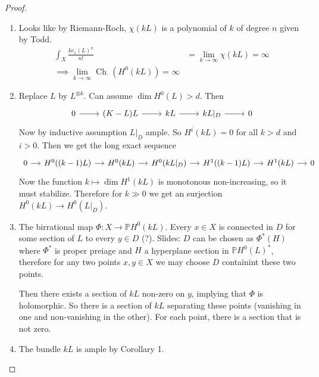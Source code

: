 \begin{proof}
\begin{enumerate}[label=\textbf{Step \arabic*}]
\begin{thing5}{We proved}\leavevmode
	there's only two possible non zero cohomology which is $H^{1}$ and $H^0$.

	That is, there exists $d\gg 0$ such that $H^{i}(L^{\otimes j})=0$ for $i>1$,  $j>d$
\end{thing5}

\item Looks like by Riemann-Roch, $\chi(kL)$ is a polynomial of  $k$ of degree $n$ given by Todd.
	\begin{align*}
	\int_{X}\frac{kc_1(L)^n}{n!}&=\lim_{k \to \infty} \chi(kL)=\infty\\
\implies \lim_{k \to \infty} \operatorname{Ch}_{\cdot}(H^{0}(kL))=\infty
	\end{align*}

\item Replace $L$ by $L^{\otimes k}$. Can assume $\dim H^{0}(L)>d$. Then
	\[\begin{tikzcd}
		0\arrow[r]&(K-L)L\arrow[r]&kL\arrow[r]&kL|_D\arrow[r]&0
	\end{tikzcd}\]
	Now by inductive assumption $L|_{D}$ ample. So $H^{i}(kL)=0$ for all $k>d$ and  $i>0$. Then we get the long exact sequence
	 \[\begin{tikzcd}[column sep=small]
		0\arrow[r]&H^{0}((k-1)L)\arrow[r]&H^{0}(kL)\arrow[r]&H^{0}(kL|_{D})\arrow[r]&H^{1}((k-1)L)\arrow[r]&H^{1}(kL)\arrow[r]&0
	\end{tikzcd}\]
	Now the function $k\mapsto \dim H^{1}(kL)$ is monotonous non-increasing, so it must stabilize. Therefore for $k\gg 0$ we get an surjection $H^{0}(kL)\longrightarrow H^{0}(L|_{D})$.

	\item The birrational map $\Phi:X\longrightarrow \mathbb{P}H^{0}(kL)$. Every $x\in X$ is connected in $D $ for some section of $L$ to every $ y\in D$ (?). {\color{3}Slides:} $D$ can be chosen as $\Phi^*(H)$ where $\Phi^*$ is proper preiage and $H$ a hyperplane section in $\mathbb{P}H^{0}(L)^*$, therefore for any two points $x,y\in X$ we may choose $D$ containint these two points.

		Then there exists a section of  $kL$ non-zero on  $y$, implying that  $\Phi$ is holomorphic. So there is a section of $kL$ separating these points (vanishing in one and non-vanishing in the other). For each point, there is a section that is not zero.

	 \item The bundle $kL$ is ample by Corollary 1.
\end{enumerate}
\end{proof}

